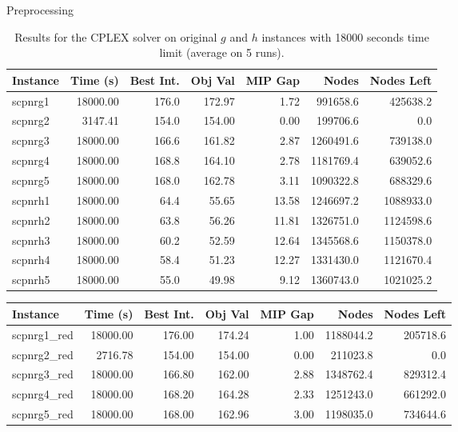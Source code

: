 \documentclass[a4paper,12pt]{mydeitesi_eng}
\begin{document}
\begin{chapter}{Preprocessing}
\begin{table}[H]
\begin{center}
\begin{tabular}{l|r|r|r|r|r|r}
\textbf{Instance} & \textbf{Time (s)} & \textbf{Best Int.} & \textbf{Obj Val} & \textbf{MIP Gap} & \textbf{Nodes} & \textbf{Nodes Left}\\
\hline
scpnrg1 & 18000.00 & 176.0 & 172.97 &  1.72 &  991658.6 & 425638.2 \\
scpnrg2 &  3147.41 & 154.0 & 154.00 &  0.00 &  199706.6 & 0.0 \\
scpnrg3 & 18000.00 & 166.6 & 161.82 &  2.87 & 1260491.6 & 739138.0 \\
scpnrg4 & 18000.00 & 168.8 & 164.10 &  2.78 & 1181769.4 & 639052.6 \\
scpnrg5 & 18000.00 & 168.0 & 162.78 &  3.11 & 1090322.8 & 688329.6 \\
\hline

scpnrh1 & 18000.00 &  64.4 &  55.65 & 13.58 & 1246697.2 & 1088933.0 \\
scpnrh2 & 18000.00 &  63.8 &  56.26 & 11.81 & 1326751.0 & 1124598.6 \\
scpnrh3 & 18000.00 &  60.2 &  52.59 & 12.64 & 1345568.6 & 1150378.0 \\
scpnrh4 & 18000.00 &  58.4 &  51.23 & 12.27 & 1331430.0 & 1121670.4 \\
scpnrh5 & 18000.00 &  55.0 &  49.98 &  9.12 & 1360743.0 & 1021025.2 \\
\end{tabular}
\end{center}
\caption{Results for the CPLEX solver on original $g$ and $h$ instances with 18000 seconds time limit (average on 5  runs).}
\label{tab:Preprocessing18000SecRun}
\end{table}


\begin{table}[H]
\begin{center}
\begin{tabular}{l|r|r|r|r|r|r}
\textbf{Instance} & \textbf{Time (s)} & \textbf{Best Int.} & \textbf{Obj Val} & \textbf{MIP Gap} & \textbf{Nodes} & \textbf{Nodes Left}\\
\hline
scpnrg1\_red & 18000.00 & 176.00 & 174.24 &  1.00 & 1188044.2 & 205718.6 \\
scpnrg2\_red &  2716.78 & 154.00 & 154.00 &  0.00 & 211023.8 & 0.0 \\
scpnrg3\_red & 18000.00 & 166.80 & 162.00 &  2.88 & 1348762.4 & 829312.4 \\
scpnrg4\_red & 18000.00 & 168.20 & 164.28 &  2.33 & 1251243.0 & 661292.0 \\
scpnrg5\_red & 18000.00 & 168.00 & 162.96 &  3.00 & 1198035.0 & 734644.6 \\
\hline


\end{tabular}
\end{center}
\end{table}
\end{chapter}
\end{document}
